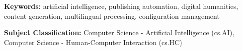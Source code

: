 \maketitle

\begin{abstract}
{ABSTRACT_CONTENT}
\end{abstract}

\vspace{1em}

\noindent\textbf{Keywords:} artificial intelligence, publishing automation, digital humanities, content generation, multilingual processing, configuration management

\vspace{1em}

\noindent\textbf{Subject Classification:} Computer Science - Artificial Intelligence (cs.AI), Computer Science - Human-Computer Interaction (cs.HC)

\newpage
